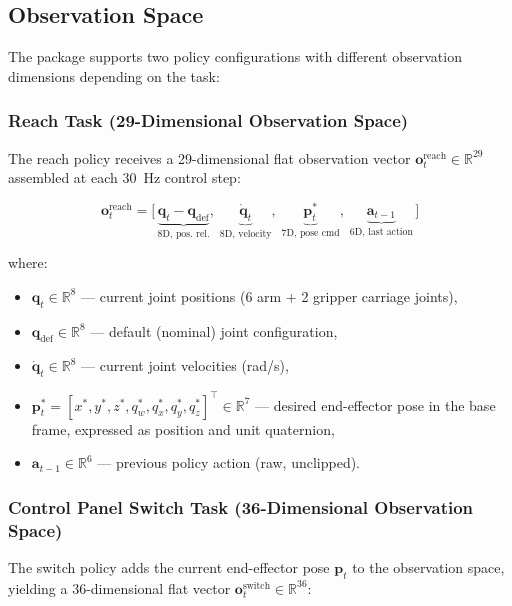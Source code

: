 \documentclass[12pt, a4paper]{article}
\begin{document}
\subsection{Observation Space}
\label{ssec:obs}

The package supports two policy configurations with different observation dimensions depending on the task:

\subsubsection{Reach Task (29-Dimensional Observation Space)}
The reach policy receives a 29-dimensional flat observation vector $\mathbf{o}_t^{\text{reach}} \in \mathbb{R}^{29}$ assembled at each 30~Hz control step:

\begin{equation}
  \mathbf{o}_t^{\text{reach}} = \bigl[\,
    \underbrace{\mathbf{q}_t - \mathbf{q}_{\text{def}}}_{\text{8D, pos. rel.}},\;
    \underbrace{\dot{\mathbf{q}}_t}_{\text{8D, velocity}},\;
    \underbrace{\mathbf{p}^*_t}_{\text{7D, pose cmd}},\;
    \underbrace{\mathbf{a}_{t-1}}_{\text{6D, last action}}
  \,\bigr]
  \label{eq:obs_reach}
\end{equation}

where:
\begin{itemize}[nosep]
  \item $\mathbf{q}_t \in \mathbb{R}^8$ — current joint positions (6 arm + 2 gripper carriage joints),
  \item $\mathbf{q}_{\text{def}} \in \mathbb{R}^8$ — default (nominal) joint configuration,
  \item $\dot{\mathbf{q}}_t \in \mathbb{R}^8$ — current joint velocities (rad/s),
  \item $\mathbf{p}^*_t = [x^*, y^*, z^*, q^*_w, q^*_x, q^*_y, q^*_z]^\top \in \mathbb{R}^7$ — desired
        end-effector pose in the base frame, expressed as position and unit quaternion,
  \item $\mathbf{a}_{t-1} \in \mathbb{R}^6$ — previous policy action (raw, unclipped).
\end{itemize}

\subsubsection{Control Panel Switch Task (36-Dimensional Observation Space)}
The switch policy adds the current end-effector pose $\mathbf{p}_t$ to the observation space, yielding a 36-dimensional flat vector $\mathbf{o}_t^{\text{switch}} \in \mathbb{R}^{36}$:
\end{document}
